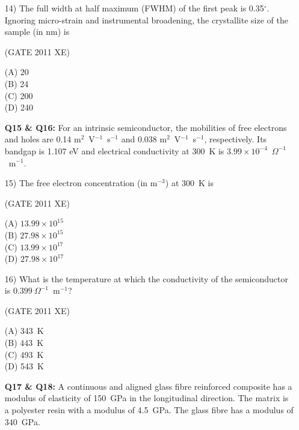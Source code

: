 \documentclass[journal,12pt,onecolumn]{IEEEtran}
\begin{document}
\begin{enumerate}
\item[14)] The full width at half maximum (FWHM) of the first peak is 0.35$^{\circ}$. Ignoring micro-strain and instrumental broadening, the crystallite size of the sample (in nm) is

\hfill{(GATE 2011 XE)}\\
\begin{multicols}{4}
(A) 20 \\
(B) 24 \\
(C) 200 \\
(D) 240
\end{multicols}

\item[\textbf{Q15 \& Q16:}] For an intrinsic semiconductor, the mobilities of free electrons and holes are 0.14 m$^2$~V$^{-1}$~s$^{-1}$ and 0.038 m$^2$~V$^{-1}$~s$^{-1}$, respectively. Its bandgap is 1.107 eV and electrical conductivity at 300~K is $3.99 \times 10^{-4}$~$\Omega^{-1}$~m$^{-1}$.


\item[15)] The free electron concentration (in m$^{-3}$) at 300~K is

\hfill{(GATE 2011 XE)}\\
\begin{multicols}{4}
(A) $13.99 \times 10^{15}$ \\
(B) $27.98 \times 10^{15}$ \\
(C) $13.99 \times 10^{17}$ \\
(D) $27.98 \times 10^{17}$
\end{multicols}

\item[16)] What is the temperature at which the conductivity of the semiconductor is $0.399~\Omega^{-1}$~m$^{-1}$?

\hfill{(GATE 2011 XE)}\\
\begin{multicols}{4}
(A) 343~K \\
(B) 443~K \\
(C) 493~K \\
(D) 543~K
\end{multicols}

\item[\textbf{Q17 \& Q18:}] A continuous and aligned glass fibre reinforced composite has a modulus of elasticity of 150~GPa in the longitudinal direction. The matrix is a polyester resin with a modulus of 4.5~GPa. The glass fibre has a modulus of 340~GPa.\\



\end{enumerate}
\end{document}

